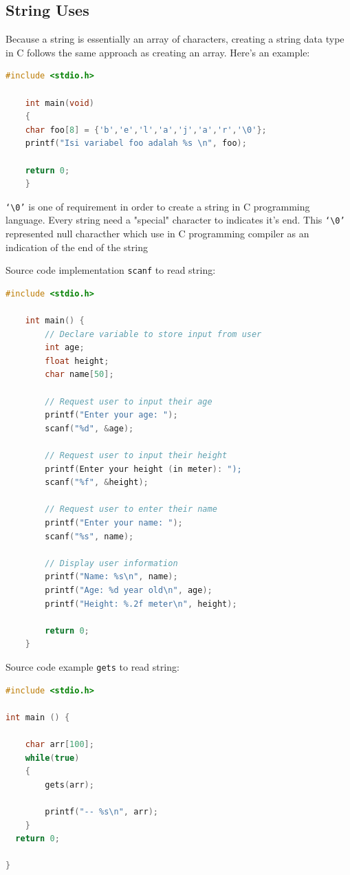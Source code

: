 \subsection{String Uses}

Because a string is essentially an array of characters, creating a string data type in C follows the same approach as creating an array. Here's an example:
\begin{lstlisting}[language=c,caption = Char in string implementation,label=lst:array1d01]
	#include <stdio.h>
 
	int main(void)
	{
	char foo[8] = {'b','e','l','a','j','a','r','\0'};
	printf("Isi variabel foo adalah %s \n", foo);
	
	return 0;
	}
\end{lstlisting}

\verb|‘\0’| is one of requirement in order to create a string in C programming language.
Every string need a "special" character to indicates it's end.
This \verb|‘\0’| represented null characther which use in C programming compiler as an indication of the end of the string

Source code implementation \verb|scanf| to read string:
\begin{lstlisting}[language=c,caption = String with scanf implementation,label=lst:scanf]
	#include <stdio.h>

	int main() {
		// Declare variable to store input from user
		int age;
		float height;
		char name[50];

		// Request user to input their age
		printf("Enter your age: ");
		scanf("%d", &age);
		
		// Request user to input their height
		printf(Enter your height (in meter): ");
		scanf("%f", &height);
		
		// Request user to enter their name
		printf("Enter your name: ");
		scanf("%s", name);

		// Display user information
		printf("Name: %s\n", name);
		printf("Age: %d year old\n", age);
		printf("Height: %.2f meter\n", height);

		return 0;
	}
\end{lstlisting}


Source code example  \verb|gets| to read string:
\begin{lstlisting}[language=c,caption = String with gets implementation,label=lst:gets]
#include <stdio.h>

int main () {
  
	char arr[100];
	while(true)
	{
		gets(arr);
		
		printf("-- %s\n", arr);
	}
  return 0;

}
\end{lstlisting}

